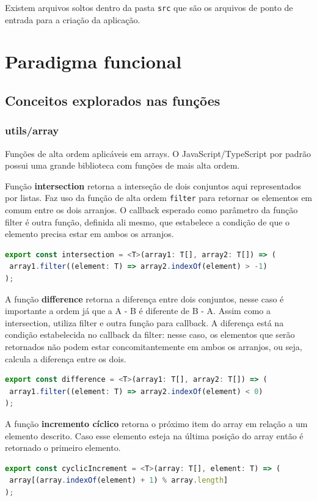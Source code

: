 \documentclass[rel_mlp]{iiufrgs}
\begin{document}
\par Existem arquivos soltos dentro da pasta \verb|src| que são os arquivos de ponto de entrada para a criação da aplicação.



\section{Paradigma funcional}

\subsection{Conceitos explorados nas funções}
\subsubsection{utils/array}
Funções de alta ordem aplicáveis em arrays. O JavaScript/TypeScript por padrão possui uma grande biblioteca com funções de mais alta ordem.


Função \textbf{intersection} retorna a interseção de dois conjuntos aqui representados por listas. Faz uso da função de alta ordem \verb|filter| para retornar os elementos em comum entre os dois arranjos. O callback esperado como parâmetro da função filter é outra função, definida ali mesmo, que estabelece a condição de que o elemento precisa estar em ambos os arranjos.
\begin{lstlisting}[language = JavaScript]
export const intersection = <T>(array1: T[], array2: T[]) => (
 array1.filter((element: T) => array2.indexOf(element) > -1)
);
\end{lstlisting}


A função \textbf{difference} retorna a diferença entre dois conjuntos, nesse caso é importante a ordem já que a A - B é diferente de B - A. Assim como a intersection, utiliza filter e outra função para callback. A diferença está na condição estabelecida no callback da filter: nesse caso, os elementos que serão retornados não podem estar concomitantemente em ambos os arranjos, ou seja, calcula a diferença entre os dois.
\begin{lstlisting}[language = JavaScript]
export const difference = <T>(array1: T[], array2: T[]) => (
 array1.filter((element: T) => array2.indexOf(element) < 0)
);
\end{lstlisting}

A função \textbf{incremento cíclico} retorna o próximo item do array em relação a um elemento descrito. Caso esse elemento esteja na última posição do array então é retornado o primeiro elemento.
\begin{lstlisting}[language = JavaScript]
export const cyclicIncrement = <T>(array: T[], element: T) => (
 array[(array.indexOf(element) + 1) % array.length]
);
\end{lstlisting}
\end{document}
